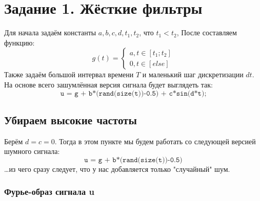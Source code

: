 \chapter{Задание 1. Жёсткие фильтры}
\label{ch:chap2}


\lstset{style=mystyle}




Для начала задаём константы $a, b, c, d, t_1, t_2$, что $t_1 < t_2$, После составляем функцию:
$$
g(t) = \begin{cases}
        a, t\in[t_1 ; t_2] \\
        0, t\in[else]
       \end{cases}
$$
Также задаём большой интервал времени $T$ и маленький шаг дискретизации $dt$. На основе всего зашумлённая версия сигнала будет выглядеть так:
$$
\texttt{u = g + b*(rand(size(t))-0.5) + c*sin(d*t);}
$$

\section{Убираем высокие частоты}

Берём $d=c=0$. Тогда в этом пункте мы будем работать со следующей версией шумного сигнала:
$$
\texttt{u = g + b*(rand(size(t))-0.5)}
$$\dots из чего сразу следует, что у нас добавляется только "случайный" шум.

\newpage
\subsection{Фурье-образ сигнала u}

